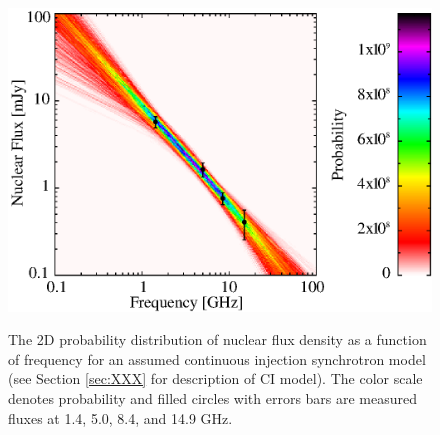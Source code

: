 \begin{figure}
  \begin{center}
    \begin{minipage}{\linewidth}
      \includegraphics*[width=\textwidth, trim=0mm 0mm 0mm 0mm, clip]{iras09-ci-fan.eps}
      \caption{The 2D probability distribution of nuclear flux density
        as a function of frequency for an assumed continuous injection
        synchrotron model (see Section \ref{sec:XXX} for description
        of CI model). The color scale denotes probability and filled
        circles with errors bars are measured fluxes at 1.4, 5.0, 8.4,
        and 14.9 GHz.}
    \end{minipage}
    \label{fig:fan}
  \end{center}
\end{figure}

